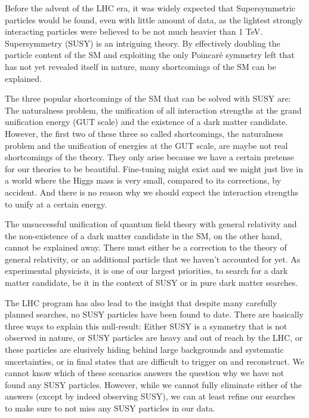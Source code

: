 \documentclass[]{cv} %
\begin{document}
\begin{statement}
Before the advent of the LHC era, it was widely expected that Supersymmetric
particles would be found, even with little amount of data, as the lightest
strongly interacting particles were believed to be not much heavier than 1 TeV.
Supersymmetry (SUSY) is an intriguing theory. By effectively doubling the
particle content of the SM and exploiting the only Poincar\'{e} symmetry left
that has not yet revealed itself in nature, many shortcomings of the SM can be
explained.

The three popular shortcomings of the SM that can be solved with SUSY are: The
naturalness problem, the unification of all interaction strengths at the grand
unification energy (GUT scale) and the existence of a dark matter candidate.
However, the first two of these three so called shortcomings, the naturalness
problem and the unification of energies at the GUT scale, are maybe not real
shortcomings of the theory.  They only arise because we have a certain pretense
for our theories to be beautiful. Fine-tuning might exist and we might just live
in a world where the Higgs mass is very small, compared to its corrections, by
accident. And there is no reason why we should expect the interaction strengths
to unify at a certain energy.

The unsuccessful unification of quantum field theory with general relativity and
the non-existence of a dark matter candidate in the SM, on the other hand,
cannot be explained away. There must either be a correction to the theory of
general relativity, or an additional particle that we haven't accounted for yet.
As experimental physicists, it is one of our largest priorities, to search for a
dark matter candidate, be it in the context of SUSY or in pure dark matter
searches.

The LHC program has also lead to the insight that despite many carefully planned
searches, no SUSY particles have been found to date. There are basically three
ways to explain this null-result: Either SUSY is a symmetry that is not observed
in nature, or SUSY particles are heavy and out of reach by the LHC, or these
particles are elusively hiding behind large backgrounds and systematic
uncertainties, or in final states that are difficult to trigger on and
reconstruct. We cannot know which of these scenarios answers the question why we
have not found any SUSY particles. However, while we cannot fully eliminate
either of the answers (except by indeed observing SUSY), we can at least refine
our searches to make sure to not miss any SUSY particles in our data.


\end{statement}
\end{document}
